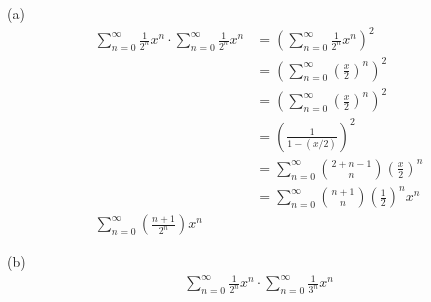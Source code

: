 
(a)
\begin{align*}
\sum_{n=0}^\infty \frac{1}{2^n} x^n
\cdot
\sum_{n=0}^\infty \frac{1}{2^n} x^n
&=
\left( \sum_{n=0}^\infty \frac{1}{2^n} x^n \right)^2
\\
&=
\left( \sum_{n=0}^\infty \left( \frac{x}{2} \right)^n \right)^2
\\
&=
\left( \sum_{n=0}^\infty \left( \frac{x}{2} \right)^n \right)^2
\\
&=
\left( \frac{1}{1 - (x/2)} \right)^2
\\
&=\sum_{n=0}^\infty \binom{2 + n - 1}{n} \left( \frac{x}{2} \right)^n
\\
&=\sum_{n=0}^\infty \binom{n + 1}{n} \left( \frac{1}{2} \right)^n x^n
\\
\sum_{n=0}^\infty \left( \frac{n + 1}{2^n} \right) x^n
\end{align*}

(b)
\begin{align*}
\sum_{n=0}^\infty \frac{1}{2^n} x^n
\cdot
\sum_{n=0}^\infty \frac{1}{3^n} x^n
\end{align*}
